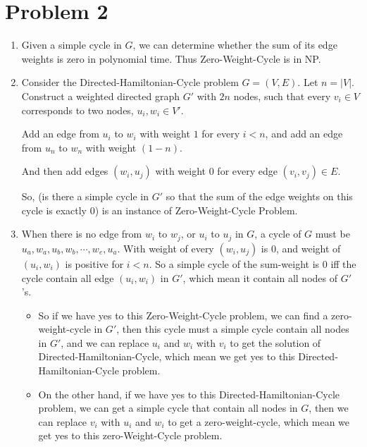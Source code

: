 \documentclass{article}
\begin{document}
\section*{Problem 2}
\begin{enumerate}[1)]
    \item  Given a simple cycle in $G$, we can determine whether the sum of its  edge weights is zero in polynomial time.  
    Thus Zero-Weight-Cycle is in NP.
    \item Consider the Directed-Hamiltonian-Cycle problem $G=(V,E)$. 
    Let $n=|V|$.
    Construct a weighted directed graph $G'$ with $2n$ nodes, 
    such that every $v_i \in V$ corresponds to two nodes, $u_i, w_i \in V'$.

    Add an edge from $u_i$ to $w_i$ with weight $1$ for every $i<n$, 
    and add an edge from $u_n$ to $w_n$ with weight $(1-n)$. 
    
    And then add edges $(w_i, u_j)$ with weight $0$ for every edge $(v_i, v_j)\in E$.

    So, (is there a simple cycle in $G'$ so that the sum of the edge weights on this cycle is exactly $0$) is an instance of Zero-Weight-Cycle Problem.
    \item 
    When there is no edge from $w_i$ to $w_j$, or $u_i$ to $u_j$ in $G$, 
    a cycle of $G$ must be $u_a,w_a,u_b,w_b,\cdots,w_e,u_a$. 
    With weight of every $(w_i,u_j)$ is $0$, and weight of $(u_i,w_i)$ is positive for $i<n$. 
    So a simple cycle of the sum-weight is $0$ iff the cycle contain all edge $(u_i,w_i)$ in $G'$, which mean it contain all nodes of $G'$'s.
    \begin{itemize}
    \item So if we have yes to this Zero-Weight-Cycle problem, 
        we can find a zero-weight-cycle in $G'$, 
        then this cycle must a simple cycle contain all nodes in $G'$, and we can replace $u_i$ and $w_i$ with $v_i$ to get the solution of Directed-Hamiltonian-Cycle, which mean we get yes to this Directed-Hamiltonian-Cycle problem.

    \item  On the other hand, if we have yes to this Directed-Hamiltonian-Cycle     problem,
        we can get a simple cycle that contain all nodes in $G$,
        then we can replace $v_i$ with $u_i$ and $w_i$ to get a zero-weight-cycle,
        which mean we get yes to this zero-Weight-Cycle problem.
    \end{itemize}
\end{enumerate}
\end{document}
